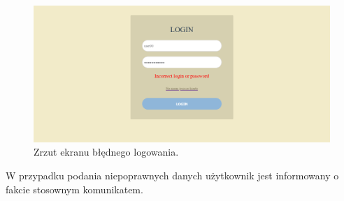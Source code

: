 \documentclass[12pt,a4paper,oneside]{article}
\begin{document}
\begin{figure}[H]
    \centering
    \includegraphics[width=\hsize,keepaspectratio]{images/login_failed.png}
    \caption{Zrzut ekranu błędnego logowania.}
\end{figure}
W przypadku podania niepoprawnych danych użytkownik jest informowany o fakcie
stosownym komunikatem.
\end{document}

